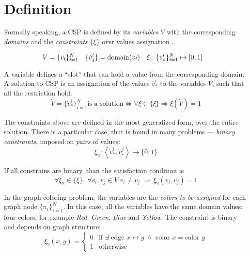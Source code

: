 \documentclass[../ThesisDoc]{subfiles}
\begin{document}
\providecommand{\rootdir}{..}



\section{Definition}
\label{sec:CSP-definition}

\noindent
Formally speaking, a CSP is defined by its \emph{variables} $V$ with the
corresponding \emph{domains} and the \emph{constraints} $\{\xi\}$
over values assignation \cite{MAS}.

\begin{align*}
  V                &= \{v_i\}_{i=1}^N
& \{{\dot v}^i_j\} &= \mathrm{domain}(v_i)
& \xi              &: \{{\dot v}^i_\ast\}_{i=1}^N \mapsto [0,1]
\end{align*}


A variable defines a ``slot'' that can hold a value from the corresponding domain.
A solution to CSP is an assignation of the values ${\dot v}^i_\ast$
to the variables $V$, such that all the restriction hold.
\begin{equation}
  {\dot V} = \{{\dot v}^i_\ast\}_{i=1}^N \text{is a solution}
   \iff \forall \xi \in \{\xi\} \Rightarrow \xi({\dot V}) = 1
\end{equation}

The constraints above are defined in the most generalized form,
over the entire solution. There is a particular case, that is found in many problems
--- \emph{binary constraints}, imposed on \emph{pairs} of values:
$$\xi_2 : \left< {\dot v}^i_\ast, {\dot v}^j_\ast \right> \mapsto \{0,1\}$$

If all constrains are binary, than the satisfaction condition is
$$\forall \xi_2     \in \{\xi\},~
  \forall v_i, v_j  \in V | v_i \not= v_j
~ \Rightarrow ~ \xi_2(v_i, v_j) = 1
$$

\medskip

In the graph coloring problem, the variables are the \emph{colors to be assigned}
for each graph node $\{n_i\}_{i=1}^N$. In this case, all the variables have
the same domain values: four colors, for example \textit{Red}, \textit{Green},
\textit{Blue} and \textit{Yellow}. The constraint is binary and depends on graph
structure:
$$ \xi_2(x,y)= \begin{cases}
  0 & \mbox{if } \exists \text{~edge~} x \leftrightarrow y
                ~\land \text{~color~} x = \text{color~} y \\
  1 & \text{otherwise}
\end{cases}
$$
\end{document}
